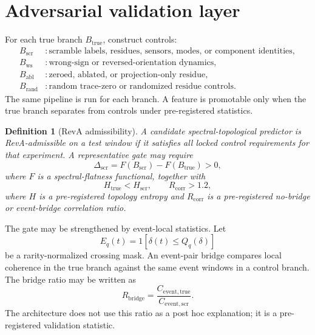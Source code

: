 \documentclass[11pt]{article}
\newtheorem{definition}{Definition}
\begin{document}
\section{Adversarial validation layer}
For each true branch $B_{\mathrm{true}}$, construct controls:
\begin{align}
B_{\mathrm{scr}}&: \text{scramble labels, residues, sensors, modes, or component identities},\\
B_{\mathrm{ws}}&: \text{wrong-sign or reversed-orientation dynamics},\\
B_{\mathrm{abl}}&: \text{zeroed, ablated, or projection-only residue},\\
B_{\mathrm{rand}}&: \text{random trace-zero or randomized residue controls}.
\end{align}
The same pipeline is run for each branch. A feature is promotable only when the true branch separates from controls under pre-registered statistics.

\begin{definition}[RevA admissibility]
A candidate spectral-topological predictor is RevA-admissible on a test window if it satisfies all locked control requirements for that experiment. A representative gate may require
\begin{equation}
\Delta_{\mathrm{scr}}=F(B_{\mathrm{scr}})-F(B_{\mathrm{true}})>0,
\end{equation}
where $F$ is a spectral-flatness functional, together with
\begin{equation}
H_{\mathrm{true}}<H_{\mathrm{scr}},\qquad R_{\mathrm{corr}}>1.2,
\end{equation}
where $H$ is a pre-registered topology entropy and $R_{\mathrm{corr}}$ is a pre-registered no-bridge or event-bridge correlation ratio.
\end{definition}

The gate may be strengthened by event-local statistics. Let
\begin{equation}
E_q(t)=1[\delta(t)\le Q_q(\delta)]
\end{equation}
be a rarity-normalized crossing mask. An event-pair bridge compares local coherence in the true branch against the same event windows in a control branch. The bridge ratio may be written as
\begin{equation}
R_{\mathrm{bridge}}=\frac{C_{\mathrm{event,true}}}{C_{\mathrm{event,scr}}}.
\end{equation}
The architecture does not use this ratio as a post hoc explanation; it is a pre-registered validation statistic.
\end{document}
